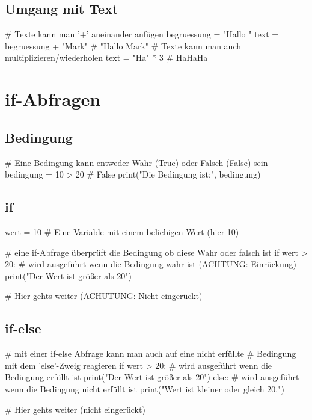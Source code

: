 \documentclass{\VorlagenPfad/coderdojokatext}
\begin{document}
\subsection{Umgang mit Text}
\begin{pythoncode}
# Texte kann man '+' aneinander anfügen
begruessung  = "Hallo "
text = begruessung + "Mark" # "Hallo Mark"
# Texte kann man auch multiplizieren/wiederholen
text = "Ha" * 3  # HaHaHa
\end{pythoncode}

\section{if-Abfragen}

\subsection{Bedingung}
\begin{pythoncode}
# Eine Bedingung kann entweder Wahr (True) oder Falsch (False) sein
bedingung = 10 > 20 # False
print("Die Bedingung ist:", bedingung)
\end{pythoncode}
\subsection{if}
\begin{pythoncode}
wert = 10 # Eine Variable mit einem beliebigen Wert (hier 10)

# eine if-Abfrage überprüft die Bedingung ob diese Wahr oder falsch ist
if wert > 20: 
	# wird ausgeführt wenn die Bedingung wahr ist (ACHTUNG: Einrückung)
	print("Der Wert ist größer als 20")

# Hier gehts weiter (ACHUTUNG: Nicht eingerückt)
\end{pythoncode}
\subsection{if-else}
\begin{pythoncode}
# mit einer if-else Abfrage kann man auch auf eine nicht erfüllte
# Bedingung mit dem 'else'-Zweig reagieren
if wert > 20: 
	# wird ausgeführt wenn die Bedingung erfüllt ist
	print("Der Wert ist größer als 20") 
else:
	# wird ausgeführt wenn die Bedingung nicht erfüllt ist
	print("Wert ist kleiner oder gleich 20.")

# Hier gehts weiter (nicht eingerückt)
\end{pythoncode}
\end{document}
